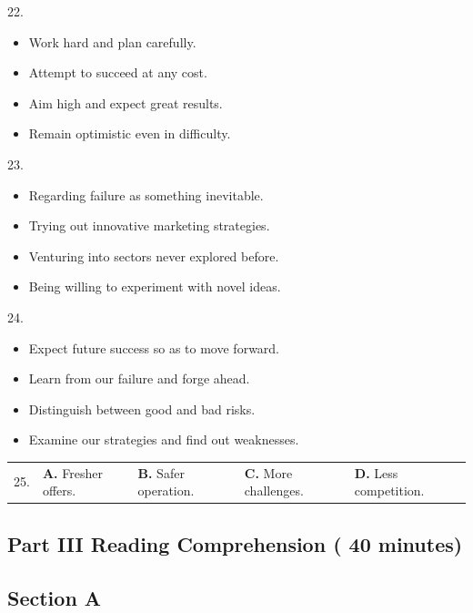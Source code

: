 \documentclass[UTF8,11pt]{ctexart}
\begin{document}
22.


\begin{itemize}[leftmargin=2em,itemsep=.2em,topsep=.4em]\item[A.] Work hard and plan carefully.
\item[B.] Attempt to succeed at any cost.
\item[C.] Aim high and expect great results.
\item[D.] Remain optimistic even in difficulty.
\end{itemize}

23.


\begin{itemize}[leftmargin=2em,itemsep=.2em,topsep=.4em]\item[A.] Regarding failure as something inevitable.
\item[B.] Trying out innovative marketing strategies.
\item[C.] Venturing into sectors never explored before.
\item[D.] Being willing to experiment with novel ideas.
\end{itemize}

24.


\begin{itemize}[leftmargin=2em,itemsep=.2em,topsep=.4em]\item[A.] Expect future success so as to move forward.
\item[B.] Learn from our failure and forge ahead.
\item[C.] Distinguish between good and bad risks.
\item[D.] Examine our strategies and find out weaknesses.
\end{itemize}

\noindent\begin{tabularx}{\linewidth}{@{}lXXXX@{}}25. & \textbf{A.} Fresher offers. & \textbf{B.} Safer operation. & \textbf{C.} More challenges. & \textbf{D.} Less competition.\\\end{tabularx}\par

\subsection*{\textbf{Part III Reading Comprehension ( 40 minutes)}}


\subsection*{\textbf{Section A}}
\end{document}
